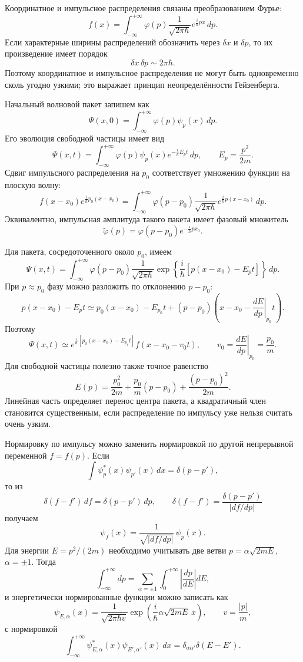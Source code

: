 \documentclass[12pt,a4paper]{article}
\begin{document}
Координатное и импульсное распределения связаны преобразованием Фурье:
\[
    f(x)=\int_{-\infty}^{+\infty}\varphi(p)
    \frac{1}{\sqrt{2\pi\hbar}}e^{\frac{i}{\hbar}px}\,dp.
\]
Если характерные ширины распределений обозначить через $\delta x$ и
$\delta p$, то их произведение имеет порядок
\[
    \delta x\,\delta p\sim2\pi\hbar.
\]
Поэтому координатное и импульсное распределения не могут быть одновременно
сколь угодно узкими; это выражает принцип неопределённости Гейзенберга.

Начальный волновой пакет запишем как
\[
    \Psi(x,0)=\int_{-\infty}^{+\infty}\varphi(p)\psi_p(x)\,dp.
\]
Его эволюция свободной частицы имеет вид
\[
    \Psi(x,t)=\int_{-\infty}^{+\infty}\varphi(p)\psi_p(x)
    e^{-\frac{i}{\hbar}E_pt}\,dp,
    \qquad
    E_p=\frac{p^2}{2m}.
\]
Сдвиг импульсного распределения на $p_0$ соответствует умножению функции
на плоскую волну:
\[
    f(x-x_0)e^{\frac{i}{\hbar}p_0(x-x_0)}
    =\int_{-\infty}^{+\infty}\varphi(p-p_0)
    \frac{1}{\sqrt{2\pi\hbar}}
    e^{\frac{i}{\hbar}p(x-x_0)}\,dp.
\]
Эквивалентно, импульсная амплитуда такого пакета имеет фазовый множитель
\[
    \widetilde\varphi(p)=\varphi(p-p_0)e^{-\frac{i}{\hbar}px_0}.
\]

Для пакета, сосредоточенного около $p_0$, имеем
\[
    \Psi(x,t)=\int_{-\infty}^{+\infty}\varphi(p-p_0)
    \frac{1}{\sqrt{2\pi\hbar}}
    \exp\!\left\{\frac{i}{\hbar}[p(x-x_0)-E_pt]\right\}\,dp.
\]
При $p\approx p_0$ фазу можно разложить по отклонению $p-p_0$:
\[
    p(x-x_0)-E_pt
    \simeq p_0(x-x_0)-E_{p_0}t
    +(p-p_0)\left(x-x_0-
    \left.\frac{dE}{dp}\right|_{p_0}t\right).
\]
Поэтому
\[
    \Psi(x,t)\simeq
    e^{\frac{i}{\hbar}[p_0(x-x_0)-E_{p_0}t]}
    f(x-x_0-v_0t),
    \qquad
    v_0=\left.\frac{dE}{dp}\right|_{p_0}=\frac{p_0}{m}.
\]
Для свободной частицы полезно также точное равенство
\[
    E(p)=\frac{p_0^2}{2m}+\frac{p_0}{m}(p-p_0)
    +\frac{(p-p_0)^2}{2m}.
\]
Линейная часть определяет перенос центра пакета, а квадратичный член
становится существенным, если распределение по импульсу уже нельзя считать
очень узким.

Нормировку по импульсу можно заменить нормировкой по другой непрерывной
переменной $f=f(p)$. Если
\[
    \int\psi_p^*(x)\psi_{p'}(x)\,dx=\delta(p-p'),
\]
то из
\[
    \delta(f-f')\,df=\delta(p-p')\,dp,
    \qquad
    \delta(f-f')=\frac{\delta(p-p')}{\left|df/dp\right|}
\]
получаем
\[
    \boxed{\psi_f(x)=\frac{1}{\sqrt{|df/dp|}}\,\psi_p(x)}.
\]
Для энергии $E=p^2/(2m)$ необходимо учитывать две ветви
$p=\alpha\sqrt{2mE}$, $\alpha=\pm1$. Тогда
\[
    \int_{-\infty}^{+\infty}dp
    =\sum_{\alpha=\pm1}\int_0^{+\infty}
      \left|\frac{dp}{dE}\right|dE,
\]
и энергетически нормированные функции можно записать как
\[
    \boxed{
    \psi_{E,\alpha}(x)=
    \frac{1}{\sqrt{2\pi\hbar v}}
    \exp\left(\frac{i}{\hbar}\alpha\sqrt{2mE}\,x\right)},
    \qquad v=\frac{|p|}{m},
\]
с нормировкой
\[
    \int_{-\infty}^{+\infty}\psi_{E,\alpha}^*(x)
    \psi_{E',\alpha'}(x)\,dx
    =\delta_{\alpha\alpha'}\delta(E-E').
\]
\end{document}
